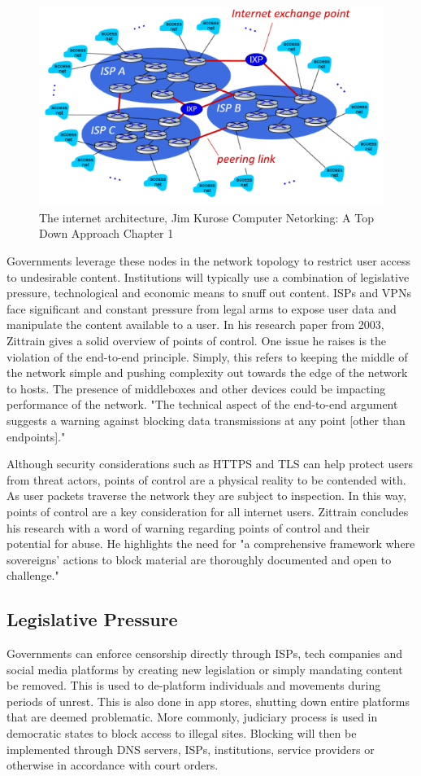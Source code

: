 \begin{figure} [H]
    \centering
    \includegraphics[width=0.5\linewidth]{State of the Art/KuroseISPs.png}
    \caption{The internet architecture, Jim Kurose Computer Netorking: A Top Down Approach Chapter 1}
    \label{fig:enter-label}
\end{figure}

Governments leverage these nodes in the network topology to restrict user access to undesirable content.  Institutions will typically use a combination of legislative pressure, technological and economic means to snuff out content. ISPs and VPNs face significant and constant pressure from legal arms to expose user data and manipulate the content available to a user. In his research paper from 2003, Zittrain gives a solid overview of points of control. One issue he raises is the violation of the end-to-end principle. Simply, this refers to keeping the middle of the network simple and pushing complexity out towards the edge of the network to hosts. The presence of middleboxes and other devices could be impacting performance of the network. "The technical aspect of the end-to-end argument suggests a warning against blocking data transmissions at any point [other than endpoints]." \cite{Zittrain_Internet_Points_of_Control} 

Although security considerations such as HTTPS and TLS can help protect users from threat actors, points of control are a physical reality to be contended with. As user packets traverse the network they are subject to inspection. In this way, points of control are a key consideration for all internet users. Zittrain concludes his research with a word of warning regarding points of control and their potential for abuse. He highlights the need for "a comprehensive framework where sovereigns’ actions to block material are thoroughly documented and open to challenge." \cite{Zittrain_Internet_Points_of_Control} 

\subsection{Legislative Pressure}
Governments can enforce censorship directly through ISPs, tech companies and social media platforms by creating new legislation or simply mandating content be removed. This is used to de-platform individuals and movements during periods of unrest. This is also done in app stores, shutting down entire platforms that are deemed problematic. More commonly, judiciary process is used in democratic states to block access to illegal sites. Blocking will then be implemented through DNS servers, ISPs, institutions, service providers or otherwise in accordance with court orders. 

